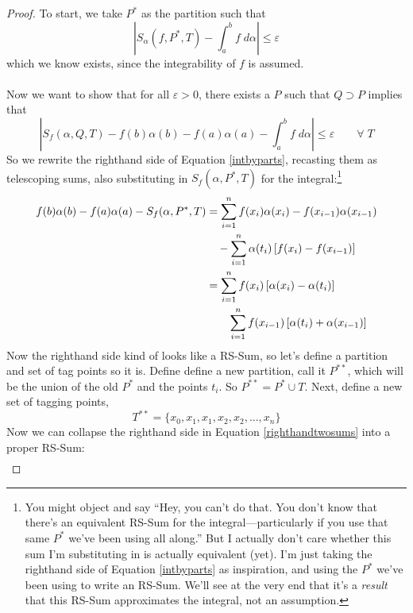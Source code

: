 \documentclass[12pt]{article}
\theoremstyle{plain}
\theoremstyle{definition}
\theoremstyle{remark}
\begin{document}
\begin{proof}
To start, we take $P^*$ as the partition such that 
\begin{equation}
    \label{ibpassump}
    \left\lvert S_\alpha(f,P^*,T) - \int^b_a f\;d\alpha 
    \right\rvert \leq \varepsilon 
\end{equation}
which we know exists, since the integrability of $f$ is assumed. 
\\
\\
Now we want to show that for all $\varepsilon>0$, there exists a $P$ such that $Q\supset P$ implies that 
    \[ \left\lvert S_f(\alpha,Q,T) -  f(b) \alpha(b) - 
        f(a)\alpha(a) - \int^b_a f \; d\alpha \right\rvert \leq 
        \varepsilon \qquad \forall \; T\]
        So we rewrite the righthand side of Equation \ref{intbyparts}, recasting them as telescoping sums, also substituting in $S_f(\alpha,P^*,T)$ for the integral:\footnote{You might object and say ``Hey, you can't do that.  You don't know that there's an equivalent RS-Sum for the integral---particularly if you use that same $P^*$ we've been using all along.'' But I actually don't care whether this sum I'm substituting in is actually equivalent (yet). I'm just taking the righthand side of Equation \ref{intbyparts} as inspiration, and using the $P^*$ we've been using to write an RS-Sum. We'll see at the very end that it's a \emph{result} that this RS-Sum approximates the integral, not an assumption.}
\begin{align}
    f(b) \alpha(b) - f(a)\alpha(a) - S_f(\alpha,P^*,T)
        &= \sum^n_{i=1} f(x_i) \alpha(x_i) - f(x_{i-1})
        \alpha(x_{i-1}) \notag\\
    &\quad - \sum^n_{i=1} \alpha(t_i) \left[f(x_i) - f(x_{i-1})
        \right] \notag\\
    &= \sum^n_{i=1} f(x_i) \left[\alpha(x_i) - \alpha(t_i) \right]
        \notag\\
    &\qquad \sum^n_{i=1} f(x_{i-1}) \left[\alpha(t_i) 
    + \alpha(x_{i-1})\right]\label{righthandtwosums}
\end{align}
Now the righthand side kind of looks like a RS-Sum, so let's define a partition and set of tag points so it is. Define define a new partition, call it $P^{**}$, which will be the union of the old $P^*$ and the points $t_i$. So $P^{**} = P^*\cup T$. Next, define a new set of tagging points,
    \[ T^{**} = \{ x_0, x_1, x_1, x_2, x_2,\ldots, x_n \} \]
Now we can collapse the righthand side in Equation \ref{righthandtwosums} into a proper RS-Sum:
\begin{align*}

\end{align*}
\end{proof}
\end{document}
